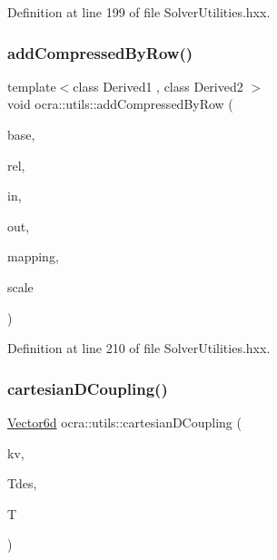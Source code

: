 Definition at line 199 of file Solver\+Utilities.\+hxx.

\hypertarget{namespaceocra_1_1utils_a0ca59cf5c0fd0b8e92a0aa53d85e0aca}{}\label{namespaceocra_1_1utils_a0ca59cf5c0fd0b8e92a0aa53d85e0aca} 
\subsubsection{\texorpdfstring{add\+Compressed\+By\+Row()}{addCompressedByRow()}\hspace{0.1cm}{\footnotesize\ttfamily [2/2]}}
{\footnotesize\ttfamily template$<$class Derived1 , class Derived2 $>$ \\
void ocra\+::utils\+::add\+Compressed\+By\+Row (\begin{DoxyParamCaption}\item[{const \hyperlink{classocra_1_1Variable}{Variable} \&}]{base,  }\item[{const \hyperlink{classocra_1_1Variable}{Variable} \&}]{rel,  }\item[{const Matrix\+Base$<$ Derived1 $>$ \&}]{in,  }\item[{Matrix\+Base$<$ Derived2 $>$ const \&}]{out,  }\item[{std\+::vector$<$ int $>$ \&}]{mapping,  }\item[{double}]{scale }\end{DoxyParamCaption})\hspace{0.3cm}{\ttfamily [inline]}}



Definition at line 210 of file Solver\+Utilities.\+hxx.

\hypertarget{namespaceocra_1_1utils_aea2b40d346ee7532a6cdb9392e7c5767}{}\label{namespaceocra_1_1utils_aea2b40d346ee7532a6cdb9392e7c5767} 
\subsubsection{\texorpdfstring{cartesian\+D\+Coupling()}{cartesianDCoupling()}}
{\footnotesize\ttfamily \hyperlink{namespaceocra_a72fe7d6cf8411efbfc475a3a78209867}{Vector6d} ocra\+::utils\+::cartesian\+D\+Coupling (\begin{DoxyParamCaption}\item[{const Eigen\+::\+Matrix$<$ double, 6, 1 $>$ \&}]{kv,  }\item[{const Eigen\+::\+Twistd \&}]{Tdes,  }\item[{const Eigen\+::\+Twistd \&}]{T }\end{DoxyParamCaption})}

